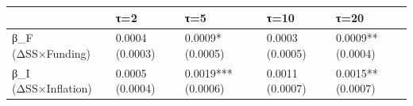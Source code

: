 \begin{tabular}{lllll}
\toprule
 & τ=2 & τ=5 & τ=10 & τ=20 \\
\midrule
β_F (ΔSS×Funding) & 0.0004
(0.0003) & 0.0009*
(0.0005) & 0.0003
(0.0005) & 0.0009**
(0.0004) \\
β_I (ΔSS×Inflation) & 0.0005
(0.0004) & 0.0019***
(0.0006) & 0.0011
(0.0007) & 0.0015**
(0.0007) \\
\bottomrule
\end{tabular}

